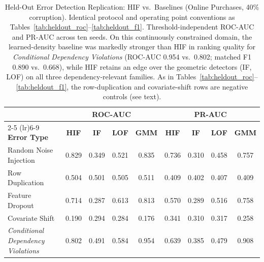 \documentclass[pdflatex,sn-mathphys-num]{sn-jnl}
\theoremstyle{thmstyleone}%
\theoremstyle{thmstyletwo}%
\theoremstyle{thmstylethree}%
\begin{document}
\begin{table}[htbp]
\centering
\caption{Held-Out Error Detection Replication: HIF vs.\ Baselines (Online Purchases, 40\% corruption). Identical protocol and operating point conventions as Tables~\ref{tab:heldout_roc}--\ref{tab:heldout_f1}. Threshold-independent ROC-AUC and PR-AUC across ten seeds. On this continuously constrained domain, the learned-density baseline was markedly stronger than HIF in ranking quality for \textit{Conditional Dependency Violations} (ROC-AUC 0.954 vs.\ 0.802; matched F1 0.890 vs.\ 0.668), while HIF retains an edge over the geometric detectors (IF, LOF) on all three dependency-relevant families. As in Tables~\ref{tab:heldout_roc}--\ref{tab:heldout_f1}, the row-duplication and covariate-shift rows are negative controls (see text).}
\label{tab:heldout_purchases}
\footnotesize
\setlength{\tabcolsep}{2pt}
\begin{tabular}{@{}lcccccccc@{}}
\toprule
& \multicolumn{4}{c}{\textbf{ROC-AUC}} & \multicolumn{4}{c}{\textbf{PR-AUC}} \\
\cmidrule(lr){2-5} \cmidrule(lr){6-9}
\textbf{Error Type} & \textbf{HIF} & \textbf{IF} & \textbf{LOF} & \textbf{GMM} & \textbf{HIF} & \textbf{IF} & \textbf{LOF} & \textbf{GMM} \\
\midrule
Random Noise Injection & 0.829 & 0.349 & 0.521 & 0.835 & 0.736 & 0.310 & 0.458 & 0.757 \\
Row Duplication & 0.504 & 0.501 & 0.505 & 0.511 & 0.409 & 0.402 & 0.407 & 0.409 \\
Feature Dropout & 0.714 & 0.287 & 0.613 & 0.813 & 0.570 & 0.289 & 0.516 & 0.758 \\
Covariate Shift & 0.190 & 0.294 & 0.284 & 0.176 & 0.341 & 0.310 & 0.317 & 0.258 \\
\midrule
\textit{Conditional Dependency Violations} & 0.802 & 0.491 & 0.584 & 0.954 & 0.639 & 0.385 & 0.479 & 0.908 \\
\bottomrule
\end{tabular}
\end{table}
\end{document}
